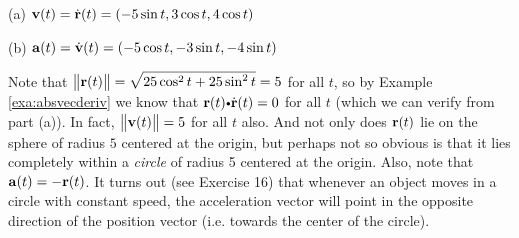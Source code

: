  \begin{solu}
 
(a) $\mathbf{ v}(t) = \dot{\mathbf{ r}}(t) = (-5 
\sin t , 3 \cos t ,
 4 \cos t )$\vspace{1mm}
 \par\noindent (b) $\mathbf{ a}(t) = \dot{\mathbf{ v}}(t) = (-5 \cos t , -3 \sin 
t , -4 \sin t )$\vspace{1mm}
 
 \par\noindent Note that ${\left\|\mathbf{ r}(t)\right\|} = \sqrt{25 \cos^2 t + 25 \sin^2 
t} = 5$ for all $t$, so by Example
 \ref{exa:absvecderiv} we know that 
$\Dotprod{\vector{r}(t)}{\dot{\vector{r}}(t)} = 0$ for all $t$ (which we can 
verify
 from part (a)). In fact, ${\left\|\mathbf{ v}(t)\right\|} = 5$ for all $t$ also. And not 
only does $\mathbf{ r}(t)$ lie on the
 sphere of radius $5$ centered at the origin, but perhaps not so obvious is 
that it lies completely within a
 \emph{circle} of radius 5 centered at the origin. Also, note that 
$\mathbf{ a}(t) = -\mathbf{ r}(t)$. It turns out (see
 Exercise 16) that whenever an object moves in a circle with constant speed, 
the acceleration vector will point in the
 opposite direction of the position vector (i.e. towards 
the center of the circle).
\end{solu}



